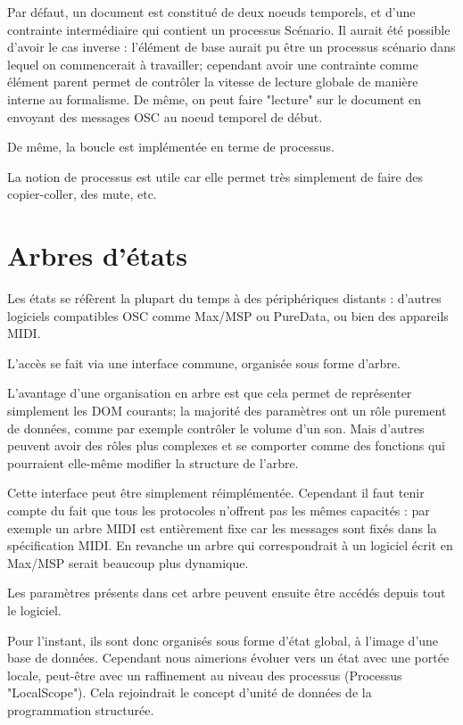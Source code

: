 \documentclass{sigchi}
\begin{document}
Par défaut, un document est constitué de deux noeuds temporels, et d'une contrainte intermédiaire qui contient un processus Scénario.
Il aurait été possible d'avoir le cas inverse : l'élément de base aurait pu être un processus scénario dans lequel on commencerait à travailler; cependant avoir une contrainte comme élément parent permet de contrôler la vitesse de lecture globale de manière interne au formalisme. De même, on peut faire "lecture" sur le document en envoyant des messages OSC au noeud temporel de début.

De même, la boucle est implémentée en terme de processus.

La notion de processus est utile car elle permet très simplement de faire des copier-coller, des mute, etc.

\section{Arbres d'états}
Les états se réfèrent la plupart du temps à des périphériques distants : d'autres logiciels compatibles OSC comme Max/MSP ou PureData, ou bien des appareils MIDI.

L'accès se fait via une interface commune, organisée sous forme d'arbre.




L'avantage d'une organisation en arbre est que cela permet de représenter simplement les DOM courants; la majorité des paramètres ont un rôle purement de données, comme par exemple contrôler le volume d'un son. Mais d'autres peuvent avoir des rôles plus complexes et se comporter comme des fonctions qui pourraient elle-même modifier la structure de l'arbre.


Cette interface peut être simplement réimplémentée. Cependant il faut tenir compte du fait que tous les protocoles n'offrent pas les mêmes capacités : par exemple un arbre MIDI est entièrement fixe car les messages sont fixés dans la spécification MIDI. En revanche un arbre qui correspondrait à un logiciel écrit en Max/MSP serait beaucoup plus dynamique.

Les paramètres présents dans cet arbre peuvent ensuite être accédés depuis tout le logiciel.

Pour l'instant, ils sont donc organisés sous forme d'état global, à l'image d'une base de données. Cependant nous aimerions évoluer vers un état avec une portée locale, peut-être avec un raffinement au niveau des processus (Processus "LocalScope"). Cela rejoindrait le concept d'unité de données de la programmation structurée.
\end{document}
